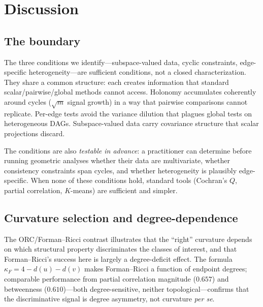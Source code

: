 \documentclass{article}
\begin{document}
\section{Discussion}
\label{sec:discussion}

\subsection{The boundary}

The three conditions we identify---subspace-valued data, cyclic constraints, edge-specific heterogeneity---are sufficient conditions, not a closed characterization.
They share a common structure: each creates information that standard scalar/pairwise/global methods cannot access.
Holonomy accumulates coherently around cycles ($\sqrt{m}$ signal growth) in a way that pairwise comparisons cannot replicate.
Per-edge tests avoid the variance dilution that plagues global tests on heterogeneous DAGs.
Subspace-valued data carry covariance structure that scalar projections discard.

The conditions are also \emph{testable in advance}: a practitioner can determine before running geometric analyses whether their data are multivariate, whether consistency constraints span cycles, and whether heterogeneity is plausibly edge-specific.
When none of these conditions hold, standard tools (Cochran's $Q$, partial correlation, $K$-means) are sufficient and simpler.

\subsection{Curvature selection and degree-dependence}

The ORC/Forman--Ricci contrast illustrates that the ``right'' curvature depends on which structural property discriminates the classes of interest, and that Forman--Ricci's success here is largely a degree-deficit effect.
The formula $\kappa_F = 4 - d(u) - d(v)$ makes Forman--Ricci a function of endpoint degrees; comparable performance from partial correlation magnitude ($0.657$) and betweenness ($0.610$)---both degree-sensitive, neither topological---confirms that the discriminative signal is degree asymmetry, not curvature \emph{per se}.
\end{document}
